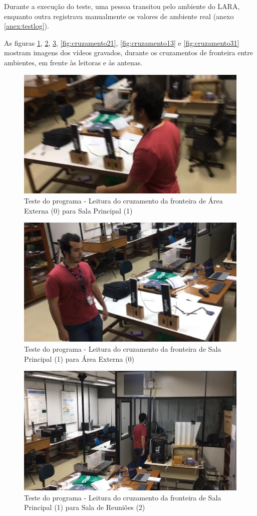 Durante a execução do teste, uma pessoa transitou pelo ambiente do LARA, enquanto outra registrava manualmente os valores de ambiente real (anexo \ref{anex:testlog}).

As figuras \ref{fig:cruzamento01}, \ref{fig:cruzamento10}, \ref{fig:cruzamento12}, \ref{fig:cruzamento21}, \ref{fig:cruzamento13} e \ref{fig:cruzamento31} mostram imagens dos vídeos gravados, durante os cruzamentos de fronteira entre ambientes, em frente às leitoras e às antenas.


\begin{figure}[H]
    \centering
    \includegraphics[width=0.5\linewidth]{figs/Resultados/cruzamento01.jpeg}
    \caption{Teste do programa - Leitura do cruzamento da fronteira de Área Externa (0) para Sala Principal (1)}
    \label{fig:cruzamento01}
\end{figure}

\begin{figure}[H]
    \centering
    \includegraphics[width=0.5\linewidth]{figs/Resultados/cruzamento10.jpeg}
    \caption{Teste do programa - Leitura do cruzamento da fronteira de Sala Principal (1) para Área Externa (0)}
    \label{fig:cruzamento10}
\end{figure}

\begin{figure}[H]
    \centering
    \includegraphics[width=0.5\linewidth]{figs/Resultados/cruzamento12.jpeg}
    \caption{Teste do programa - Leitura do cruzamento da fronteira de Sala Principal (1) para Sala de Reuniões (2)}
    \label{fig:cruzamento12}
\end{figure}

